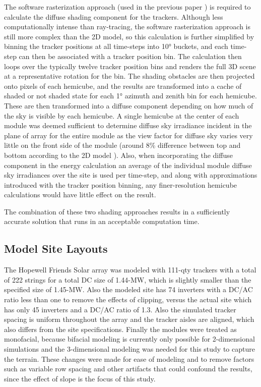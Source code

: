 \documentclass[conference]{IEEEtran}
\begin{document}
The software rasterization approach (used in the previous paper \cite{Mikofski_9300381}) is required to calculate the diffuse shading component for the trackers. Although less computationally intense than ray-tracing, the software rasterization approach is still more complex than the 2D model, so this calculation is further simplified by binning the tracker positions at all time-steps into 10° buckets, and each time-step can then be associated with a tracker position bin. The calculation then loops over the typically twelve tracker position bins and renders the full 3D scene at a representative rotation for the bin. The shading obstacles are then projected onto pixels of each hemicube, and the results are transformed into a cache of shaded or not shaded state for each 1° azimuth and zenith bin for each hemicube. These are then transformed into a diffuse component depending on how much of the sky is visible by each hemicube. A single hemicube at the center of each module was deemed sufficient to determine diffuse sky irradiance incident in the plane of array for the entire module as the view factor for diffuse sky varies very little on the front side of the module (around 8\% difference between top and bottom according to the 2D model \cite{Mikofski_8980572}). Also, when incorporating the diffuse component in the energy calculation an average of the individual module diffuse sky irradiances over the site is used per time-step, and along with approximations introduced with the tracker position binning, any finer-resolution hemicube calculations would have little effect on the result.

The combination of these two shading approaches results in a sufficiently accurate solution that runs in an acceptable computation time.

\subsection{Model Site Layouts}

The Hopewell Friends Solar array was modeled with 111-qty trackers with a total of 222 strings for a total DC size of 1.44-MW, which is slightly smaller than the specified size of 1.45-MW. Also the modeled site has 74 inverters with a DC/AC ratio less than one to remove the effects of clipping, versus the actual site which has only 45 inverters and a DC/AC ratio of 1.3. Also the simulated tracker spacing is uniform throughout the array and the tracker aisles are aligned, which also differs from the site specifications. Finally the modules were treated as monofacial, because bifacial modeling is currently only possible for 2-dimensional simulations and the 3-dimensional modeling was needed for this study to capture the terrain. These changes were made for ease of modeling and to remove factors such as variable row spacing and other artifacts that could confound the results, since the effect of slope is the focus of this study.
\end{document}
